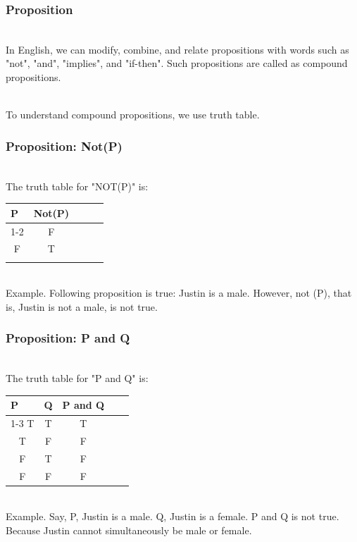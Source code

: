 \documentclass{beamer}
\numberwithin{equation}{section}
\begin{document}
\begin{frame}
\frametitle{Proposition}

\ \\In English, we can modify, combine, and relate propositions with words such as "not", "and", "implies", and "if-then". Such propositions are called as compound propositions. \pause

\ \\To understand compound propositions, we use truth table.

\end{frame}



\begin{frame}
\frametitle{Proposition: Not(P)}

\ \\The truth table for "NOT(P)" is:

\begin{table}[]
\begin{tabular}{lllll}
P                     & Not(P)                &  &  &  \\ \cline{1-2}
\multicolumn{1}{c}{T} & \multicolumn{1}{c}{F} &  &  &  \\
\multicolumn{1}{c}{F} & \multicolumn{1}{c}{T} &  &  &  \\
                      &                       &  &  & 
\end{tabular}
\end{table} \pause

\ \\Example. Following proposition is true: Justin is a male. However, not (P), that is, Justin is not a male, is not true.

\end{frame}



\begin{frame}
\frametitle{Proposition: P and Q}

\ \\The truth table for "P and Q" is:

\begin{table}[]
\begin{tabular}{cccll}
\multicolumn{1}{l}{P} & \multicolumn{1}{l}{Q} & \multicolumn{1}{l}{P and Q} &  &  \\ \cline{1-3}
T                     & T                     & T                           &  &  \\
T                     & F                     & F                           &  &  \\
F                     & T                     & F                           &  &  \\
F                     & F                     & F                           &  & 
\end{tabular}
\end{table} \pause

\ \\Example. Say, P, Justin is a male. Q, Justin is a female. P and Q is not true. Because Justin cannot simultaneously be male or female.

\end{frame}
\end{document}
